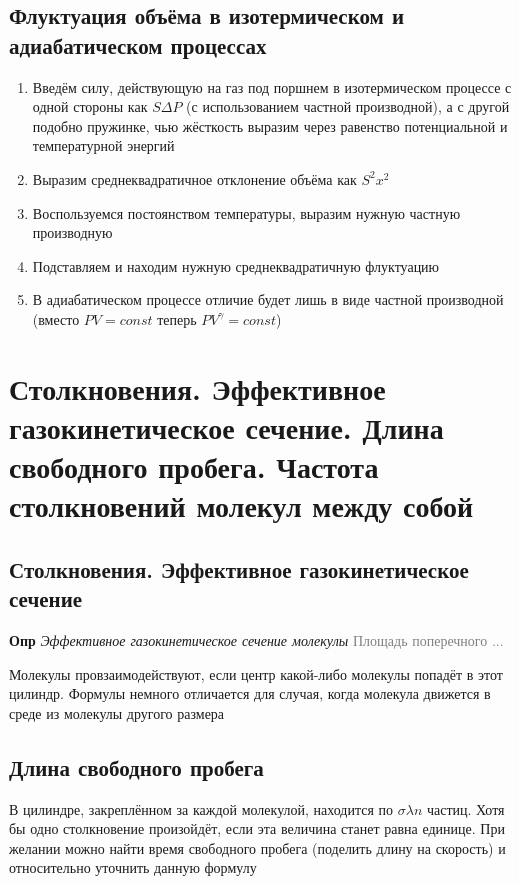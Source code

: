 \documentclass[a4paper, 14pt]{article}
\begin{document}
    \subsection{Флуктуация объёма в изотермическом и адиабатическом процессах}
    
    \begin{enumerate}
        \item Введём силу, действующую на газ под поршнем в изотермическом процессе с одной стороны как $S \Delta P$
        (с использованием частной производной), а с другой подобно пружинке, чью жёсткость выразим через равенство
        потенциальной и температурной энергий
        \item Выразим среднеквадратичное отклонение объёма как $S^2 x^2$
        \item Воспользуемся постоянством температуры, выразим нужную частную производную
        \item Подставляем и находим нужную среднеквадратичную флуктуацию
        \item В адиабатическом процессе отличие будет лишь в виде частной производной (вместо $PV = const$ теперь $PV^\gamma = const$)
    \end{enumerate}
    
    \section{Столкновения. Эффективное газокинетическое сечение.
    Длина свободного пробега.
    Частота столкновений молекул между собой}
    
    \subsection{Столкновения. Эффективное газокинетическое сечение}
    
    \textbf{Опр} \textit{Эффективное газокинетическое сечение молекулы} \textcolor{gray}{Площадь поперечного ...}
    
    Молекулы провзаимодействуют, если центр какой-либо молекулы попадёт в этот цилиндр.
    Формулы немного отличается для случая, когда молекула движется в среде из молекулы другого размера
    
    \subsection{Длина свободного пробега}
    
    В цилиндре, закреплённом за каждой молекулой, находится по $\sigma \lambda n$ частиц.
    Хотя бы одно столкновение произойдёт, если эта величина станет равна единице.
    При желании можно найти время свободного пробега (поделить длину на скорость) и относительно уточнить данную формулу
    
\end{document}
